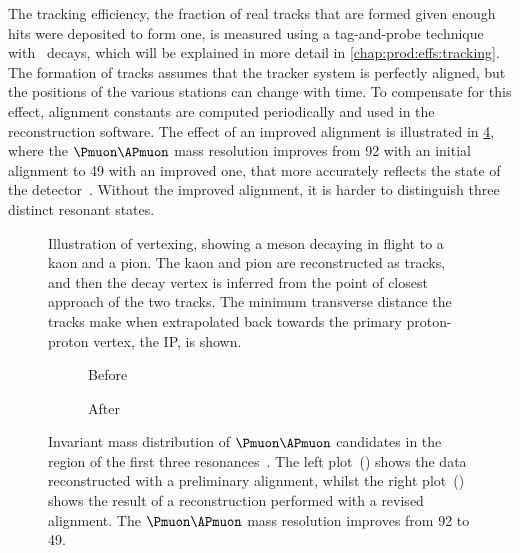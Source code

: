 The tracking efficiency, the fraction of real tracks that are formed given 
enough hits were deposited to form one, is measured using a tag-and-probe 
technique with \JpsiTomumu\ decays, which will be explained in more detail in 
\cref{chap:prod:effs:tracking}.
The formation of tracks assumes that the tracker system is perfectly aligned, 
but the positions of the various stations can change with time.
To compensate for this effect, alignment constants are computed periodically 
and used in the reconstruction software.
The effect of an improved alignment is illustrated in 
\cref{fig:intro:lhcb:alignment}, where the $\Pmuon\APmuon$ mass resolution 
improves from \SI{92}{\MeVcc} with an initial alignment to \SI{49}{\MeVcc} with 
an improved one, that more accurately reflects the state of the 
detector~\cite{Dujany:082010}.
Without the improved alignment, it is harder to distinguish three distinct 
resonant states.

\begin{figure}
  \centering
  
  \caption{%
    Illustration of vertexing, showing a \PDz meson decaying in flight to a 
    kaon and a pion.
    The kaon and pion are reconstructed as tracks, and then the \PDzero decay 
    vertex is inferred from the point of closest approach of the two tracks.
    The minimum transverse distance the tracks make when extrapolated back 
    towards the primary proton-proton vertex, the \acf{IP}, is shown.
  }
  \label{fig:intro:lhcb:vertexing}
\end{figure}

\begin{figure}
  \begin{subfigure}{0.5\textwidth}
    \centering
    
    \caption{Before}
    \label{fig:intro:lhcb:alignment:pre}
  \end{subfigure}
  \begin{subfigure}{0.5\textwidth}
    \centering
    
    \caption{After}
    \label{fig:intro:lhcb:alignment:post}
  \end{subfigure}
  \caption{%
    Invariant mass distribution of $\Pmuon\APmuon$ candidates in the region of 
    the first three \PUpsilon resonances~\cite{Dujany:082010}.
    The left plot~() shows the data 
    reconstructed with a preliminary alignment, whilst the right 
    plot~() shows the result of a 
    reconstruction performed with a revised alignment.
    The $\Pmuon\APmuon$ mass resolution improves from \SI{92}{\MeVcc} to 
    \SI{49}{\MeVcc}.
  }
  \label{fig:intro:lhcb:alignment}
\end{figure}

